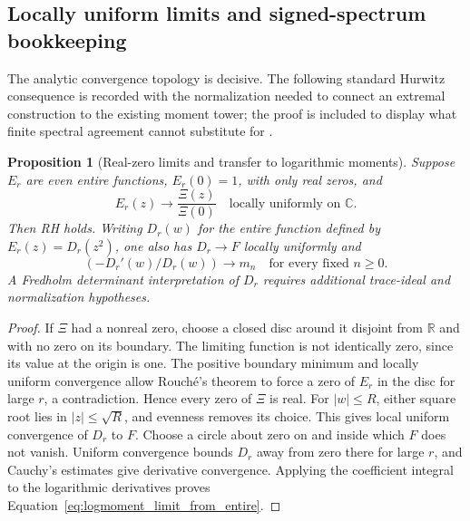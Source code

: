 \documentclass[11pt,letterpaper]{article}
\numberwithin{equation}{section}
\newtheorem{proposition}[theorem]{Proposition}
\theoremstyle{definition}
\theoremstyle{remark}
\newcommand{\R}{\mathbb R}
\newcommand{\C}{\mathbb C}
\begin{document}
\subsection{Locally uniform limits and signed-spectrum bookkeeping}
\label{subsec:weilconvergence}
The analytic convergence topology is decisive. The following standard Hurwitz consequence is recorded with the normalization needed to connect an extremal construction to the existing moment tower; the proof is included to display what finite spectral agreement cannot substitute for \cite{levin,connesvansuijlekom2025}.

\begin{proposition}[Real-zero limits and transfer to logarithmic moments]
\label{prop:realzero_limit}
Suppose $E_r$ are even entire functions, $E_r(0)=1$, with only real zeros, and
\begin{equation}
 E_r(z)\longrightarrow \frac{\Xi(z)}{\Xi(0)}
 \quad\text{locally uniformly on }\C.
 \label{eq:entire_realzero_limit}
\end{equation}
Then RH holds. Writing $D_r(w)$ for the entire function defined by $E_r(z)=D_r(z^2)$, one also has $D_r\to F$ locally uniformly and
\begin{equation}
 [w^n]\left(-D_r'(w)/D_r(w)\right)\longrightarrow m_n
 \quad\text{for every fixed }n\geq0.
 \label{eq:logmoment_limit_from_entire}
\end{equation}
A Fredholm determinant interpretation of $D_r$ requires additional trace-ideal and normalization hypotheses.
\end{proposition}
\begin{proof}
If $\Xi$ had a nonreal zero, choose a closed disc around it disjoint from $\R$ and with no zero on its boundary. The limiting function is not identically zero, since its value at the origin is one. The positive boundary minimum and locally uniform convergence allow Rouch\'e's theorem to force a zero of $E_r$ in the disc for large $r$, a contradiction. Hence every zero of $\Xi$ is real. For $|w|\leq R$, either square root lies in $|z|\leq\sqrt R$, and evenness removes its choice. This gives local uniform convergence of $D_r$ to $F$. Choose a circle about zero on and inside which $F$ does not vanish. Uniform convergence bounds $D_r$ away from zero there for large $r$, and Cauchy's estimates give derivative convergence. Applying the coefficient integral to the logarithmic derivatives proves Equation~\eqref{eq:logmoment_limit_from_entire}.
\end{proof}
\end{document}
